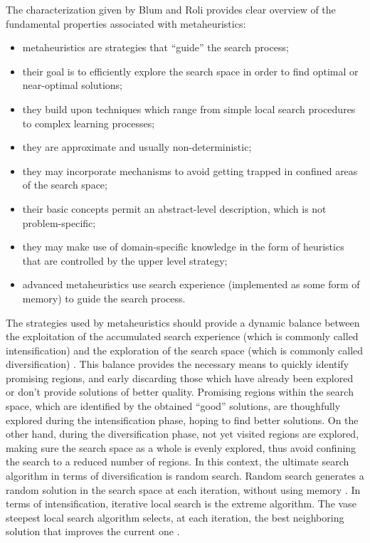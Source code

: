 The characterization given by Blum and Roli \cite{Blum-Metaheuristics_in_combinatorial_optimization_overview_and_coconceptual_comparison:2003}
provides clear overview of the fundamental properties associated with
metaheuristics:
\begin{itemize}
\item metaheuristics are strategies that \textquotedblleft{}guide\textquotedblright{}
the search process;
\item their goal is to efficiently explore the search space in order to
find optimal or near-optimal solutions;
\item they build upon techniques which range from simple local search procedures
to complex learning processes;
\item they are approximate and usually non-deterministic;
\item they may incorporate mechanisms to avoid getting trapped in confined
areas of the search space;
\item their basic concepts permit an abstract-level description, which is
not problem-specific;
\item they may make use of domain-specific knowledge in the form of heuristics
that are controlled by the upper level strategy;
\item advanced metaheuristics use search experience (implemented as some
form of memory) to guide the search process.
\end{itemize}
The strategies used by metaheuristics should provide a dynamic balance
between the exploitation of the accumulated search experience (which
is commonly called intensification) and the exploration of the search
space (which is commonly called diversification) \cite{Blum-Metaheuristics_in_combinatorial_optimization_overview_and_coconceptual_comparison:2003}.
This balance provides the necessary means to quickly identify promising
regions, and early discarding those which have already been explored
or don't provide solutions of better quality. Promising regions within
the search space, which are identified by the obtained ``good''
solutions, are thoughfully explored during the intensification phase,
hoping to find better solutions. On the other hand, during the diversification
phase, not yet visited regions are explored, making sure the search
space as a whole is evenly explored, thus avoid confining the search
to a reduced number of regions. In this context, the ultimate search
algorithm in terms of diversification is random search. Random search
generates a random solution in the search space at each iteration,
without using memory \cite{Talbi_Metaheuristics:2009}. In terms of
intensification, iterative local search is the extreme algorithm.
The vase steepest local search algorithm selects, at each iteration,
the best neighboring solution that improves the current one \cite{Talbi_Metaheuristics:2009}.


